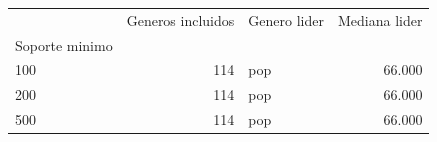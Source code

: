\begin{tabular}{lrlr}
\toprule
 & Generos incluidos & Genero lider & Mediana lider \\
Soporte minimo &  &  &  \\
\midrule
100 & 114 & pop & 66.000 \\
200 & 114 & pop & 66.000 \\
500 & 114 & pop & 66.000 \\
\bottomrule
\end{tabular}
